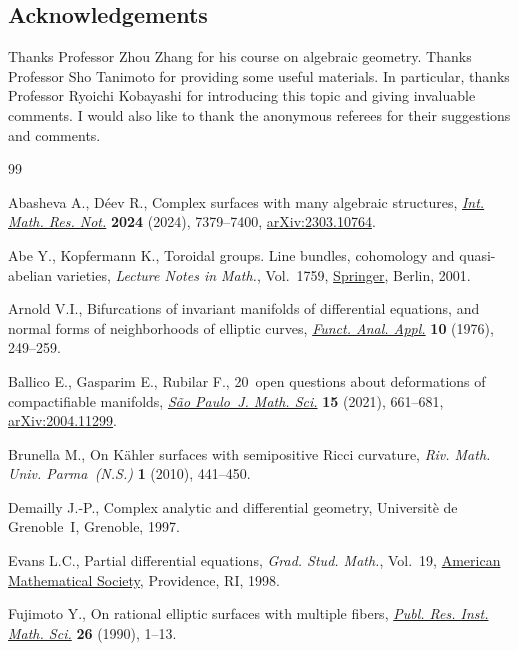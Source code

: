 \documentclass[pdftex]{sigma}
\numberwithin{equation}{section}
\begin{document}
\subsection*{Acknowledgements}
Thanks Professor Zhou Zhang for his course on algebraic geometry. Thanks Professor Sho Tanimoto for providing some useful materials. In particular, thanks Professor Ryoichi Kobayashi for introducing this topic and giving invaluable comments. I would also like to thank the anonymous referees for their suggestions and comments.

\begin{thebibliography}{99}
\footnotesize\itemsep=0pt

Abasheva A., D\'eev R., Complex surfaces with many algebraic structures,
 \href{https://doi.org/10.1093/imrn/rnad190}{\textit{Int. Math. Res. Not.}}
 \textbf{2024} (2024), 7379--7400,
 \href{http://arxiv.org/abs/2303.10764}{arXiv:2303.10764}.

Abe Y., Kopfermann K., Toroidal groups. Line bundles, cohomology and
 quasi-abelian varieties, \textit{Lecture Notes in Math.}, Vol.~1759,
 \href{https://doi.org/10.1007/b80605}{Springer}, Berlin, 2001.

Arnold V.I., Bifurcations of invariant manifolds of differential equations, and
 normal forms of neighborhoods of elliptic curves,
 \href{https://doi.org/10.1007/BF01076024}{\textit{Funct. Anal. Appl.}}
 \textbf{10} (1976), 249--259.

Ballico E., Gasparim E., Rubilar F., 20~open questions about deformations of
 compactifiable manifolds,
 \href{https://doi.org/10.1007/s40863-021-00213-8}{\textit{S\~{a}o Paulo~J.
 Math. Sci.}} \textbf{15} (2021), 661--681,
 \href{http://arxiv.org/abs/2004.11299}{arXiv:2004.11299}.

Brunella M., On {K}\"ahler surfaces with semipositive {R}icci curvature,
 \textit{Riv. Math. Univ. Parma~(N.S.)} \textbf{1} (2010), 441--450.

Demailly J.-P., Complex analytic and differential geometry, Universit\`e de
 Grenoble~I, Grenoble, 1997.

Evans L.C., Partial differential equations, \textit{Grad. Stud. Math.},
 Vol.~19, \href{https://doi.org/10.1090/gsm/019}{American Mathematical
 Society}, Providence, RI, 1998.

Fujimoto Y., On rational elliptic surfaces with multiple fibers,
 \href{https://doi.org/10.2977/prims/1195171661}{\textit{Publ. Res. Inst.
 Math. Sci.}} \textbf{26} (1990), 1--13.


\end{thebibliography}
\end{document}
